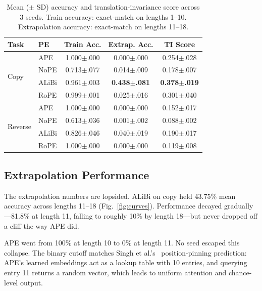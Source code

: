 \documentclass[10pt,twocolumn]{article}
\begin{document}
\begin{table}[t]
\centering
\caption{Mean ($\pm$ SD) accuracy and translation-invariance score across 3 seeds. Train accuracy: exact-match on lengths 1--10. Extrapolation accuracy: exact-match on lengths 11--18.}
\label{tab:main}
\begin{tabular}{@{}llccc@{}}
\toprule
\textbf{Task} & \textbf{PE} & \textbf{Train Acc.} & \textbf{Extrap. Acc.} & \textbf{TI Score} \\
\midrule
\multirow{4}{*}{Copy}
 & APE   & 1.000\scriptsize{$\pm$.000} & 0.000\scriptsize{$\pm$.000} & 0.254\scriptsize{$\pm$.028} \\
 & NoPE  & 0.713\scriptsize{$\pm$.077} & 0.014\scriptsize{$\pm$.009} & 0.178\scriptsize{$\pm$.007} \\
 & ALiBi & 0.961\scriptsize{$\pm$.003} & \textbf{0.438\scriptsize{$\pm$.081}} & \textbf{0.378\scriptsize{$\pm$.019}} \\
 & RoPE  & 0.999\scriptsize{$\pm$.001} & 0.025\scriptsize{$\pm$.016} & 0.301\scriptsize{$\pm$.040} \\
\midrule
\multirow{4}{*}{Reverse}
 & APE   & 1.000\scriptsize{$\pm$.000} & 0.000\scriptsize{$\pm$.000} & 0.152\scriptsize{$\pm$.017} \\
 & NoPE  & 0.613\scriptsize{$\pm$.036} & 0.001\scriptsize{$\pm$.002} & 0.088\scriptsize{$\pm$.002} \\
 & ALiBi & 0.826\scriptsize{$\pm$.046} & 0.040\scriptsize{$\pm$.019} & 0.190\scriptsize{$\pm$.017} \\
 & RoPE  & 1.000\scriptsize{$\pm$.000} & 0.000\scriptsize{$\pm$.000} & 0.119\scriptsize{$\pm$.008} \\
\bottomrule
\end{tabular}
\end{table}

\subsection{Extrapolation Performance}
\label{sec:extrap}

The extrapolation numbers are lopsided.
ALiBi on copy held 43.75\% mean accuracy across lengths 11--18 (Fig.~\ref{fig:curves}).
Performance decayed gradually---81.8\% at length 11, falling to roughly 10\% by length 18---but never dropped off a cliff the way APE did.

APE went from 100\% at length 10 to 0\% at length 11.
No seed escaped this collapse.
The binary cutoff matches Singh et al.'s~\cite{singh2026relative} position-pinning prediction: APE's learned embeddings act as a lookup table with 10 entries, and querying entry 11 returns a random vector, which leads to uniform attention and chance-level output.
\end{document}
